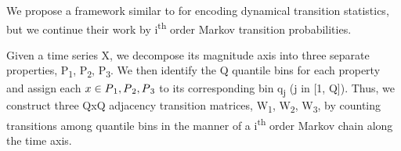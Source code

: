 \documentclass{turabian-thesis}
\begin{document}




We propose a framework similar to \cite{wang_encoding_nodate}  for encoding dynamical transition statistics, but we continue their work by i\textsuperscript{th} order Markov transition probabilities.

Given a time series X, we decompose its magnitude axis into three separate properties, P\textsubscript{1},  P\textsubscript{2},  P\textsubscript{3}. We then identify the Q quantile bins for each property  and assign each $x \in P\textsubscript{1},  P\textsubscript{2},  P\textsubscript{3}$ to its corresponding bin q\textsubscript{j} (j in [1, Q]). Thus, we construct three QxQ adjacency transition matrices, W\textsubscript{1}, W\textsubscript{2}, W\textsubscript{3}, by counting transitions among quantile bins in the manner of a i\textsuperscript{th} order Markov chain along the time axis.
\end{document}

